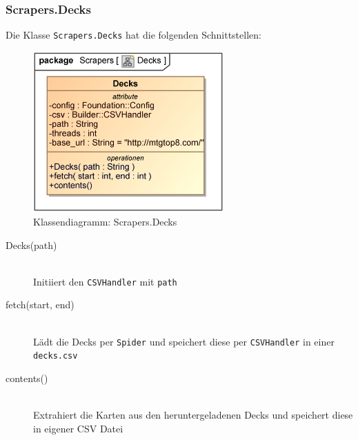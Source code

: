 \subsubsection{Scrapers.Decks}
Die Klasse \verb|Scrapers.Decks| hat die folgenden Schnittstellen:
\begin{figure}[H]
    \myfloatalign
    \includegraphics[width=0.65\textwidth]{gfx/MtGDeepAnalysis/Decks.eps}
    \caption{Klassendiagramm: Scrapers.Decks}
    \label{fig:class:Scrapers.Decks}
\end{figure}
\begin{description}
    \item[Decks(path)] \hfill \\
    Initiiert den \verb|CSVHandler| mit \verb|path|
    
    \item[fetch(start, end)] \hfill \\
    Lädt die Decks per \verb|Spider| und speichert diese per \verb|CSVHandler| in einer \verb|decks.csv|
    
    \item[contents()] \hfill \\
    Extrahiert die Karten aus den heruntergeladenen Decks und speichert diese in eigener \ac{CSV} Datei
\end{description}

